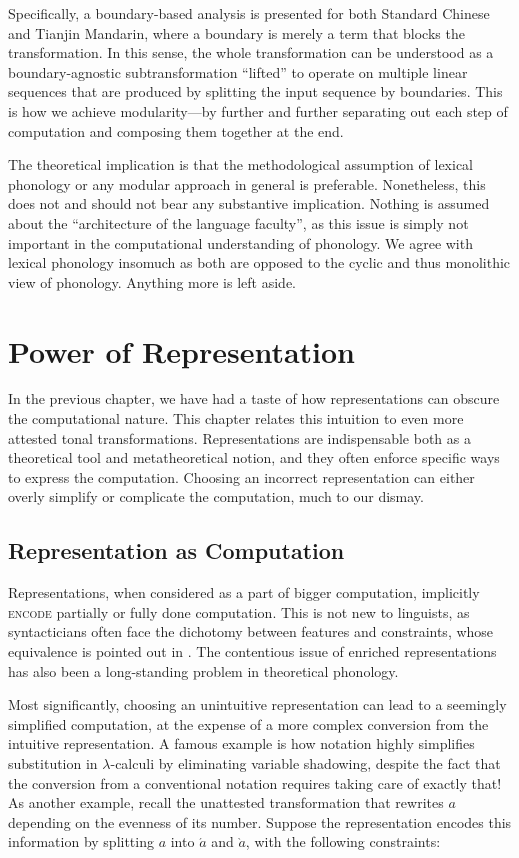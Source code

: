 \documentclass[12pt, a4paper]{report}
\newcommand{\textterm}[1]{\textsc{#1}\index{#1}}
\begin{document}
Specifically, a boundary-based analysis is presented for both Standard
Chinese and Tianjin Mandarin, where a boundary is merely a term that
blocks the transformation.  In this sense, the whole transformation
can be understood as a boundary-agnostic subtransformation
\enquote{lifted} to operate on multiple linear sequences that are
produced by splitting the input sequence by boundaries.  This is how we
achieve modularity---by further and further separating out each step
of computation and composing them together at the end.

The theoretical implication is that the methodological assumption of
lexical phonology or any modular approach in general is preferable.
Nonetheless, this does not and should not bear any substantive
implication.  Nothing is assumed about the \enquote{architecture of
  the language faculty}, as this issue is simply not important in the
computational understanding of phonology.  We agree with lexical
phonology insomuch as both are opposed to the cyclic and thus
monolithic view of phonology.  Anything more is left aside.

\chapter{Power of Representation}
In the previous chapter, we have had a taste of how representations
can obscure the computational nature.  This chapter relates this
intuition to even more attested tonal transformations.
Representations are indispensable both as a theoretical tool and
metatheoretical notion, and they often enforce specific ways to
express the computation.  Choosing an incorrect representation can
either overly simplify or complicate the computation, much to our
dismay.

\section{Representation as Computation}
Representations, when considered as a part of bigger computation,
implicitly \textterm{encode} partially or fully done computation.
This is not new to linguists, as syntacticians often face the
dichotomy between features and constraints, whose equivalence is
pointed out in \textcite{g17cgdfc}.  The contentious issue of enriched
representations has also been a long-standing problem in theoretical
phonology.

Most significantly, choosing an unintuitive representation can lead to
a seemingly simplified computation, at the expense of a more complex
conversion from the intuitive representation.  A famous example is how
 notation highly simplifies substitution in
\(\lambda\)-calculi by eliminating variable shadowing, despite the
fact that the conversion from a conventional notation requires taking
care of exactly that!  As another example, recall the unattested
transformation that rewrites \(a\) depending on the evenness of its
number.  Suppose the representation encodes this information by
splitting \(a\) into \(\acute{a}\) and \(\grave{a}\), with the
following constraints:
\end{document}
